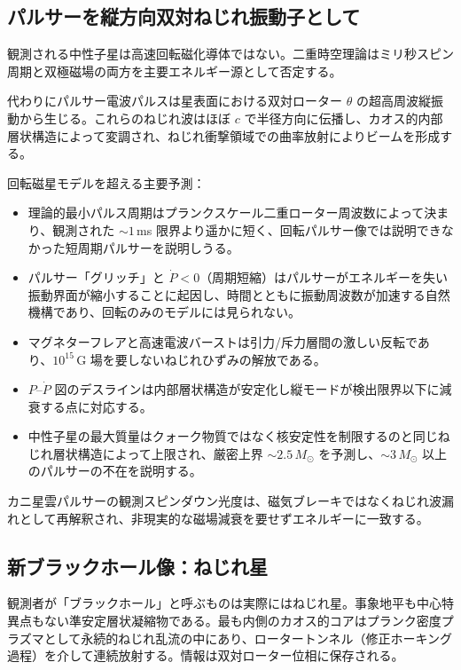 \documentclass[a4paper]{article}
\begin{document}
\subsection{パルサーを縦方向双対ねじれ振動子として}

観測される中性子星は高速回転磁化導体ではない。二重時空理論はミリ秒スピン周期と双極磁場の両方を主要エネルギー源として否定する。

代わりにパルサー電波パルスは星表面における双対ローター $\theta$ の超高周波縦振動から生じる。これらのねじれ波はほぼ $c$ で半径方向に伝播し、カオス的内部層状構造によって変調され、ねじれ衝撃領域での曲率放射によりビームを形成する。

回転磁星モデルを超える主要予測：
\begin{itemize}
\item 理論的最小パルス周期はプランクスケール二重ローター周波数によって決まり、観測された $\sim 1$\,ms 限界より遥かに短く、回転パルサー像では説明できなかった短周期パルサーを説明しうる。
\item パルサー「グリッチ」と $\dot{P} < 0$（周期短縮）はパルサーがエネルギーを失い振動界面が縮小することに起因し、時間とともに振動周波数が加速する自然機構であり、回転のみのモデルには見られない。
\item マグネターフレアと高速電波バーストは引力/斥力層間の激しい反転であり、$10^{15}$\,G 場を要しないねじれひずみの解放である。
\item $P$--$\dot{P}$ 図のデスラインは内部層状構造が安定化し縦モードが検出限界以下に減衰する点に対応する。
\item 中性子星の最大質量はクォーク物質ではなく核安定性を制限するのと同じねじれ層状構造によって上限され、厳密上界 $\sim 2.5\,M_\odot$ を予測し、$\sim 3\,M_\odot$ 以上のパルサーの不在を説明する。
\end{itemize}

カニ星雲パルサーの観測スピンダウン光度は、磁気ブレーキではなくねじれ波漏れとして再解釈され、非現実的な磁場減衰を要せずエネルギーに一致する。

\subsection{新ブラックホール像：ねじれ星}

観測者が「ブラックホール」と呼ぶものは実際にはねじれ星。事象地平も中心特異点もない準安定層状凝縮物である。最も内側のカオス的コアはプランク密度プラズマとして永続的ねじれ乱流の中にあり、ロータートンネル（修正ホーキング過程）を介して連続放射する。情報は双対ローター位相に保存される。
\end{document}
